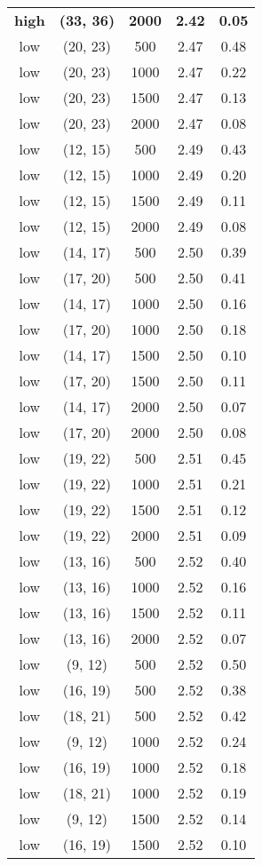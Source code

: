 \begin{tabular}{c c c c c}
\textbf{high} & \textbf{(33, 36)} & \textbf{ 2000} & \textbf{2.42} & \textbf{0.05} \\
low & (20, 23) &  500 & 2.47 & 0.48 \\
low & (20, 23) &  1000 & 2.47 & 0.22 \\
low & (20, 23) &  1500 & 2.47 & 0.13 \\
low & (20, 23) &  2000 & 2.47 & 0.08 \\
low & (12, 15) &  500 & 2.49 & 0.43 \\
low & (12, 15) &  1000 & 2.49 & 0.20 \\
low & (12, 15) &  1500 & 2.49 & 0.11 \\
low & (12, 15) &  2000 & 2.49 & 0.08 \\
low & (14, 17) &  500 & 2.50 & 0.39 \\
low & (17, 20) &  500 & 2.50 & 0.41 \\
low & (14, 17) &  1000 & 2.50 & 0.16 \\
low & (17, 20) &  1000 & 2.50 & 0.18 \\
low & (14, 17) &  1500 & 2.50 & 0.10 \\
low & (17, 20) &  1500 & 2.50 & 0.11 \\
low & (14, 17) &  2000 & 2.50 & 0.07 \\
low & (17, 20) &  2000 & 2.50 & 0.08 \\
low & (19, 22) &  500 & 2.51 & 0.45 \\
low & (19, 22) &  1000 & 2.51 & 0.21 \\
low & (19, 22) &  1500 & 2.51 & 0.12 \\
low & (19, 22) &  2000 & 2.51 & 0.09 \\
low & (13, 16) &  500 & 2.52 & 0.40 \\
low & (13, 16) &  1000 & 2.52 & 0.16 \\
low & (13, 16) &  1500 & 2.52 & 0.11 \\
low & (13, 16) &  2000 & 2.52 & 0.07 \\
low & (9, 12) &  500 & 2.52 & 0.50 \\
low & (16, 19) &  500 & 2.52 & 0.38 \\
low & (18, 21) &  500 & 2.52 & 0.42 \\
low & (9, 12) &  1000 & 2.52 & 0.24 \\
low & (16, 19) &  1000 & 2.52 & 0.18 \\
low & (18, 21) &  1000 & 2.52 & 0.19 \\
low & (9, 12) &  1500 & 2.52 & 0.14 \\
low & (16, 19) &  1500 & 2.52 & 0.10 \\

\end{tabular}
